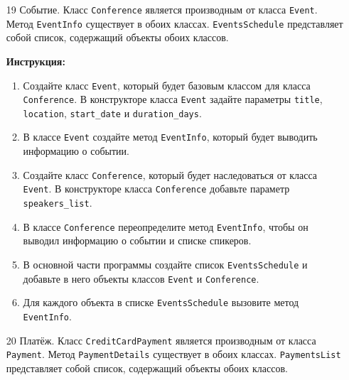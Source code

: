 \begin{enumerate}
\item[19]
Событие. Класс \texttt{Conference} является производным от класса \texttt{Event}. Метод \texttt{EventInfo} существует в обоих классах. \texttt{EventsSchedule} представляет собой список, содержащий объекты обоих классов.

\textbf{Инструкция:}
\begin{enumerate}
    \item Создайте класс \texttt{Event}, который будет базовым классом для класса \texttt{Conference}. В конструкторе класса \texttt{Event} задайте параметры \texttt{title}, \texttt{location}, \texttt{start\_date} и \texttt{duration\_days}.
    \item В классе \texttt{Event} создайте метод \texttt{EventInfo}, который будет выводить информацию о событии.
    \item Создайте класс \texttt{Conference}, который будет наследоваться от класса \texttt{Event}. В конструкторе класса \texttt{Conference} добавьте параметр \texttt{speakers\_list}.
    \item В классе \texttt{Conference} переопределите метод \texttt{EventInfo}, чтобы он выводил информацию о событии и списке спикеров.
    \item В основной части программы создайте список \texttt{EventsSchedule} и добавьте в него объекты классов \texttt{Event} и \texttt{Conference}.
    \item Для каждого объекта в списке \texttt{EventsSchedule} вызовите метод \texttt{EventInfo}.
\end{enumerate}

\item[20]
Платёж. Класс \texttt{CreditCardPayment} является производным от класса \texttt{Payment}. Метод \texttt{PaymentDetails} существует в обоих классах. \texttt{PaymentsList} представляет собой список, содержащий объекты обоих классов.


\end{enumerate}
